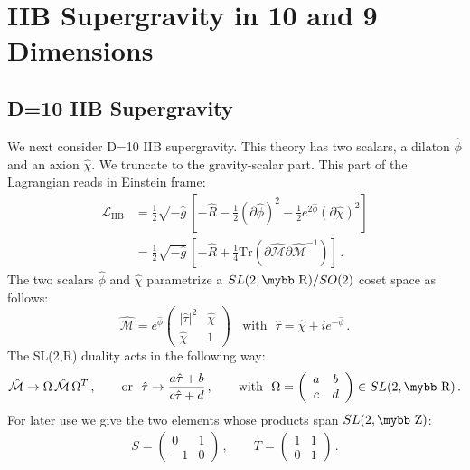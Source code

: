 \documentclass[12pt,a4paper]{article}
\def\bb#1{\hbox{\mybb#1}}
\begin{document}
\section{IIB Supergravity in 10 and 9 Dimensions}

\subsection{D=10 IIB Supergravity}


We next consider  D=10 IIB supergravity. This theory has two
scalars, a dilaton $\hat\phi$ and an axion $\hat\chi$. We truncate
to the gravity-scalar part. This part of the Lagrangian reads in
Einstein frame:
\begin{equation}
\begin{aligned}
  \mathcal{L}_{\text{IIB}}
  & = \tfrac{1}{2} \sqrt{-\hat{g}} \,
    [ -\hat{R} -\tfrac{1}{2} (\partial \hat{\phi})^2
    -\tfrac{1}{2} e^{2 \hat{\phi}} (\partial \hat{\chi})^2 ]  \\
  & = \tfrac{1}{2} \sqrt{-\hat{g}} \,
    [ -\hat{R} + \tfrac{1}{4} \text{Tr}
    (\partial \hat{\mathcal{M}} \partial \hat{\mathcal{M}}^{-1}) ] \,.
\end{aligned}
\label{10DIIB}
\end{equation}
The two scalars $\hat{\phi}$ and $\hat{\chi}$ parametrize a
$SL(2,\bb{R})/SO(2)$ coset space as follows:
\begin{equation}
  \hat{\mathcal{M}} = e^{\hat{\phi}} \left(
  \begin{array}{cc} |\hat{\tau}|^2 & \hat{\chi} \\ \hat{\chi} & 1 \end{array}
  \right) ~~~~ \text{with} ~~~ \hat{\tau} = \hat{\chi} + i e^{-\hat{\phi}} \,.
\end{equation}
The SL(2,\bb{R}) duality acts in the following way:
\begin{equation}
  \mathcal{\hat{M}} \rightarrow \Omega \, \mathcal{\hat{M}} \, \Omega^T \,, \qquad
  \text{or~~} \hat{\tau} \rightarrow \frac{a \hat{\tau} +b}{c\hat{\tau} +d} \,, \qquad
  \text{with~~} \Omega = \left( \begin{array}{cc} a&b\\c&d \end{array} \right) \in SL(2,\bb{R}) \,.
\label{Sduality}
\end{equation}
For later use we give the two elements whose products span $SL(2,\bb{Z})$:
\begin{align}
  S= \left( \begin{array}{cc} 0&1\\-1&0 \end{array} \right) \,, \qquad
  T= \left( \begin{array}{cc} 1&1\\0&1 \end{array} \right) \,.
\label{SandT}
\end{align}
\end{document}
